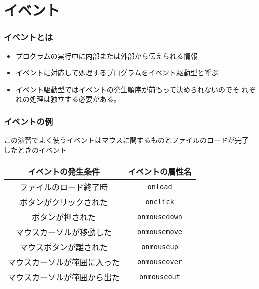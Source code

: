  \section{イベント}
\begin{frame}[containsverbatim]
 \frametitle{イベントとは}
 \begin{itemize}
  \item プログラムの実行中に内部または外部から伝えられる情報
  \item イベントに対応して処理するプログラムをイベント駆動型と呼ぶ
  \item イベント駆動型ではイベントの発生順序が前もって決められないのでそ
        れぞれの処理は独立する必要がある。
 \end{itemize}
\end{frame}
\newcommand{\Event}[1]{\texttt{#1}}
\begin{frame}[containsverbatim]
 \frametitle{イベントの例}
 この演習でよく使うイベントはマウスに関するものとファイルのロードが完了
 したときのイベント
\begin{center}
\begin{tabular}[t]{|c|c|}
 \hline
イベントの発生条件& イベントの属性名%
\\\hline
ファイルのロード終了時  &\Event{onload} \\ \hline
ボタンがクリックされた &\Event{onclick}  \\ \hline
ボタンが押された &\Event{onmousedown}  \\ \hline
マウスカーソルが移動した&\Event{onmousemove}  \\ \hline
マウスボタンが離された&  \Event{onmouseup} \\ \hline
マウスカーソルが範囲に入った&\Event{onmouseover}  \\ \hline
マウスカーソルが範囲から出た&\Event{onmouseout}  \\ \hline
\end{tabular} 
\end{center}
\end{frame}
